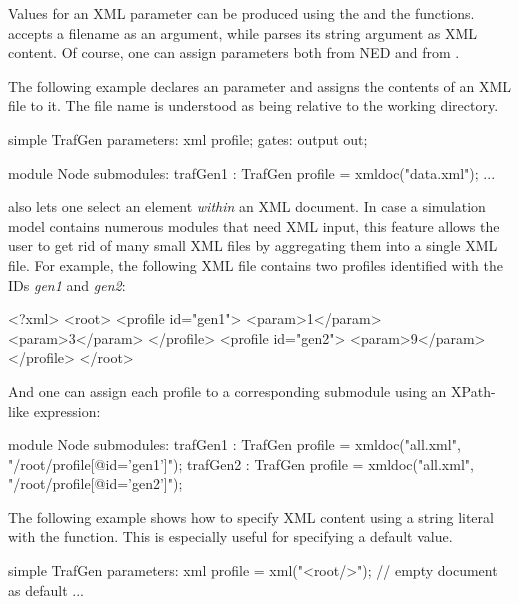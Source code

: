 Values for an XML parameter can be produced using the  and
the  functions.  accepts a filename as an
argument, while  parses its string argument as XML content. Of
course, one can assign  parameters both from NED and from
.

The following example declares an  parameter and assigns the
contents of an XML file to it. The file name is understood as being relative to
the working directory.

\begin{ned}
simple TrafGen {
    parameters:
        xml profile;
    gates:
        output out;
}

module Node {
    submodules:
        trafGen1 : TrafGen {
            profile = xmldoc("data.xml");
        }
        ...
}
\end{ned}

 also lets one select an element \textit{within} an XML
document. In case a simulation model contains numerous modules that need XML
input, this feature allows the user to get rid of many small XML files by
aggregating them into a single XML file. For example, the following XML file
contains two profiles identified with the IDs \textit{gen1} and \textit{gen2}:

\begin{xml}
<?xml>
<root>
    <profile id="gen1">
          <param>1</param>
          <param>3</param>
    </profile>
    <profile id="gen2">
          <param>9</param>
    </profile>
</root>
\end{xml}

And one can assign each profile to a corresponding submodule using an XPath-like expression:

\begin{ned}
module Node {
    submodules:
        trafGen1 : TrafGen {
            profile = xmldoc("all.xml", "/root/profile[@id='gen1']");
        }
        trafGen2 : TrafGen {
            profile = xmldoc("all.xml", "/root/profile[@id='gen2']");
        }
}
\end{ned}

The following example shows how to specify XML content using a string literal
with the  function. This is especially useful for specifying a
default value.

\begin{ned}
simple TrafGen {
    parameters:
        xml profile = xml("<root/>"); // empty document as default
        ...
}
\end{ned}

